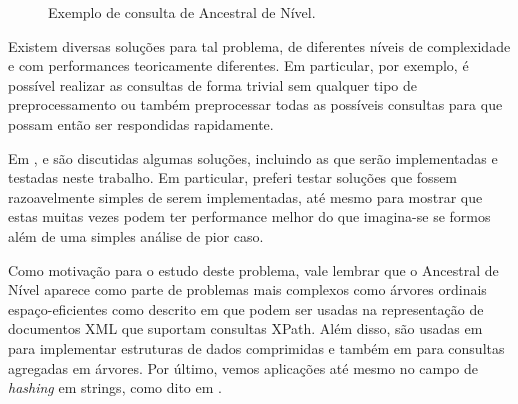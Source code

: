   \begin{figure}[H]
    \hspace{3cm}
      \caption[Exemplo de consulta de Ancestral de Nível]
      {Exemplo de consulta de Ancestral de Nível.}
    \end{figure}

Existem diversas soluções para tal problema, de diferentes níveis de complexidade e
com performances teoricamente diferentes. Em particular, por exemplo, é possível
realizar as consultas de forma trivial sem qualquer tipo de preprocessamento ou também
preprocessar todas as possíveis consultas para que possam então ser respondidas
rapidamente.

Em \citet{Bender2002TheLA}, \citet{LAInPractice} e \citet{menghani2019simple} são
discutidas algumas soluções, incluindo as que serão implementadas e testadas neste
trabalho. Em particular, preferi testar soluções que fossem razoavelmente simples
de serem implementadas, até mesmo para mostrar que estas muitas vezes podem ter
performance melhor do que imagina-se se formos além de uma simples análise de pior caso.

Como motivação para o estudo deste problema, vale lembrar que o Ancestral de Nível
aparece como parte de problemas mais complexos como árvores ordinais espaço-eficientes
como descrito em \citet{Geary:2006:SOT:1198513.1198516} que podem ser usadas na
representação de documentos XML que suportam consultas XPath. Além disso, são usadas
em \citet{Sadakane:2006:SSD:1109557.1109693} para implementar estruturas de dados
comprimidas e também em \citet{Yuan:2009:EDS:1514894.1514908} para consultas agregadas
em árvores. Por último, vemos aplicações até mesmo no campo de \textit{hashing} em
strings, como dito em \citet{10.1007/3-540-61258-0_11}.

